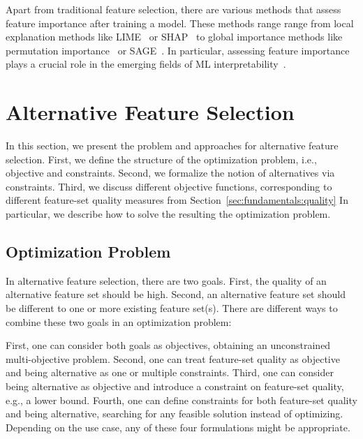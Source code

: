 \documentclass{article}
\theoremstyle{definition}
\begin{document}
Apart from traditional feature selection, there are various methods that assess feature importance after training a model.
These methods range range from local explanation methods like LIME~\cite{ribeiro2016should} or SHAP~\cite{lundberg2017unified} to global importance methods like permutation importance~\cite{breiman2001random} or SAGE~\cite{covert2020understanding}.
In particular, assessing feature importance plays a crucial role in the emerging fields of ML interpretability~\cite{carvalho2019machine}.

\section{Alternative Feature Selection}
\label{sec:approach}

In this section, we present the problem and approaches for alternative feature selection.
First, we define the structure of the optimization problem, i.e., objective and constraints.
Second, we formalize the notion of alternatives via constraints.
Third, we discuss different objective functions, corresponding to different feature-set quality measures from Section~\ref{sec:fundamentals:quality}
In particular, we describe how to solve the resulting the optimization problem.

\subsection{Optimization Problem}
\label{sec:approach:problem}

In alternative feature selection, there are two goals.
First, the quality of an alternative feature set should be high.
Second, an alternative feature set should be different to one or more existing feature set(s).
There are different ways to combine these two goals in an optimization problem:

First, one can consider both goals as objectives, obtaining an unconstrained multi-objective problem.
Second, one can treat feature-set quality as objective and being alternative as one or multiple constraints.
Third, one can consider being alternative as objective and introduce a constraint on feature-set quality, e.g., a lower bound.
Fourth, one can define constraints for both feature-set quality and being alternative, searching for any feasible solution instead of optimizing.
Depending on the use case, any of these four formulations might be appropriate.
\end{document}
